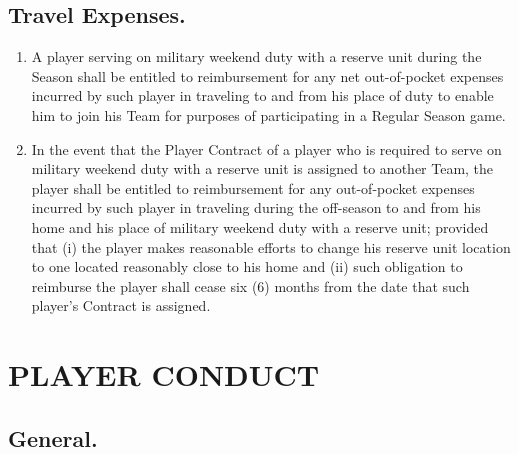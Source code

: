 \documentclass[
]{book}
\providecommand{\tightlist}{%
  \setlength{\itemsep}{0pt}\setlength{\parskip}{0pt}}
\begin{document}
\hypertarget{travel-expenses.}{%
\section{Travel Expenses.}\label{travel-expenses.}}

\begin{enumerate}
\def\labelenumi{(\alph{enumi})}
\tightlist
\item
  A player serving on military weekend duty with a reserve unit during the Season shall be entitled to reimbursement for any net out-of-pocket expenses incurred by such player in traveling to and from his place of duty to enable him to join his Team for purposes of participating in a Regular Season game.
\item
  In the event that the Player Contract of a player who is required to serve on military weekend duty with a reserve unit is assigned to another Team, the player shall be entitled to reimbursement for any out-of-pocket expenses incurred by such player in traveling during the off-season to and from his home and his place of military weekend duty with a reserve unit; provided that (i) the player makes reasonable efforts to change his reserve unit location to one located reasonably close to his home and (ii) such obligation to reimburse the player shall cease six (6) months from the date that such player's Contract is assigned.
\end{enumerate}

\hypertarget{player-conduct}{%
\chapter{PLAYER CONDUCT}\label{player-conduct}}

\hypertarget{general.-1}{%
\section{General.}\label{general.-1}}
\end{document}
